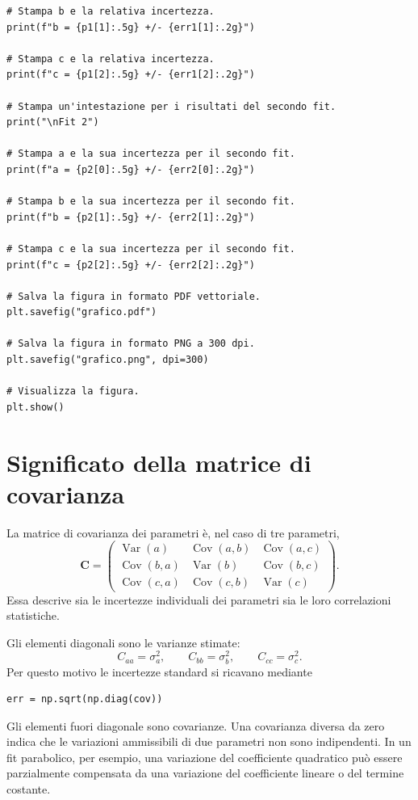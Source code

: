 \documentclass[11pt,a4paper]{book}
\begin{document}
\begin{lstlisting}
# Stampa b e la relativa incertezza.
print(f"b = {p1[1]:.5g} +/- {err1[1]:.2g}")

# Stampa c e la relativa incertezza.
print(f"c = {p1[2]:.5g} +/- {err1[2]:.2g}")

# Stampa un'intestazione per i risultati del secondo fit.
print("\nFit 2")

# Stampa a e la sua incertezza per il secondo fit.
print(f"a = {p2[0]:.5g} +/- {err2[0]:.2g}")

# Stampa b e la sua incertezza per il secondo fit.
print(f"b = {p2[1]:.5g} +/- {err2[1]:.2g}")

# Stampa c e la sua incertezza per il secondo fit.
print(f"c = {p2[2]:.5g} +/- {err2[2]:.2g}")

# Salva la figura in formato PDF vettoriale.
plt.savefig("grafico.pdf")

# Salva la figura in formato PNG a 300 dpi.
plt.savefig("grafico.png", dpi=300)

# Visualizza la figura.
plt.show()
\end{lstlisting}

\section{Significato della matrice di covarianza}
La matrice di covarianza dei parametri è, nel caso di tre parametri,
\[
 \mathbf{C}=
 \begin{pmatrix}
 \operatorname{Var}(a) & \operatorname{Cov}(a,b) & \operatorname{Cov}(a,c)\\
 \operatorname{Cov}(b,a) & \operatorname{Var}(b) & \operatorname{Cov}(b,c)\\
 \operatorname{Cov}(c,a) & \operatorname{Cov}(c,b) & \operatorname{Var}(c)
 \end{pmatrix}.
\]
Essa descrive sia le incertezze individuali dei parametri sia le loro correlazioni statistiche.

Gli elementi diagonali sono le varianze stimate:
\[
 C_{aa}=\sigma_a^2,\qquad
 C_{bb}=\sigma_b^2,\qquad
 C_{cc}=\sigma_c^2.
\]
Per questo motivo le incertezze standard si ricavano mediante
\begin{lstlisting}
err = np.sqrt(np.diag(cov))
\end{lstlisting}
Gli elementi fuori diagonale sono covarianze. Una covarianza diversa da zero indica che le variazioni ammissibili di due parametri non sono indipendenti. In un fit parabolico, per esempio, una variazione del coefficiente quadratico può essere parzialmente compensata da una variazione del coefficiente lineare o del termine costante.
\end{document}
